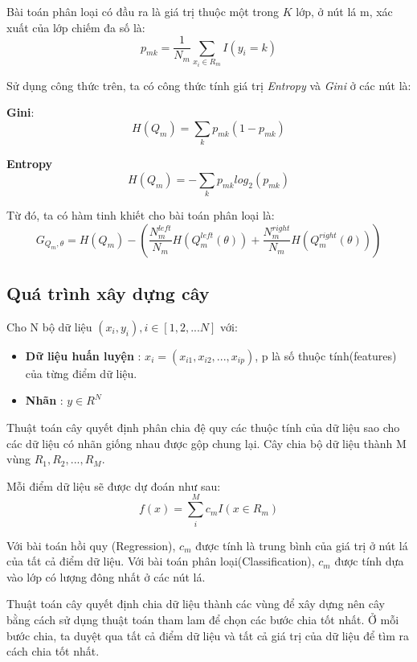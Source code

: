 \documentclass[../main-report.tex]{subfiles}
\begin{document}
\begin{enumerate}
Bài toán phân loại có đầu ra là giá trị thuộc một trong $K$ lớp, ở nút lá m, xác xuất của lớp chiếm đa số là:
\begin{equation}
    p_{mk} = \frac{1}{N_{m}} \sum_{x_{i} \in R_{m}} I(y_{i} = k)
\end{equation}

Sử dụng công thức trên, ta có công thức tính giá trị \textit{Entropy} và \textit{Gini} ở các nút là:

\textbf{Gini}:
\begin{equation}
    H(Q_{m}) = \sum_{k}p_{mk}(1 - p_{mk})
\end{equation}

\textbf{Entropy}
\begin{equation}
    H(Q_{m}) = - \sum_{k}p_{mk}log_{2}(p_{mk})
\end{equation}

Từ đó, ta có hàm tinh khiết cho bài toán phân loại là:
\begin{equation}
    G_{Q_{m}, \theta} = H(Q_{m}) - (\frac{N_{m}^{left}}{N_{m}}H(Q^{left}_{m}(\theta)) + \frac{N_{m}^{right}}{N_{m}}H(Q^{right}_{m}(\theta)))
\end{equation}
\end{enumerate}

\subsection{Quá trình xây dựng cây}
Cho N bộ dữ liệu  $(x_{i}, y_{i}), i \in [1, 2, ...N]$ với:
\begin{itemize}
\item \textbf{Dữ liệu huấn luyện} : $x_{i} = (x_{i1}, x_{i2}, ..., x_{ip})$, p là số thuộc tính(features) của từng điểm dữ liệu.
\item \textbf{Nhãn} : $y \in R^{N}$
\end{itemize}

Thuật toán cây quyết định phân chia đệ quy các thuộc tính của dữ liệu sao cho các dữ liệu có nhãn giống nhau được gộp chung lại. Cây chia bộ dữ liệu thành M vùng $R_{1}, R_{2}, ..., R_{M}$.

Mỗi điểm dữ liệu sẽ được dự đoán như sau:
$$f(x) = \sum_{i}^{M} c_{m}I(x \in R_{m})$$

Với bài toán hồi quy (Regression), $c_{m}$ được tính là trung bình của giá trị ở nút lá của tất cả điểm dữ liệu. Với bài toán phân loại(Classification), $c_{m}$ được tính dựa vào lớp có lượng đông nhất ở các nút lá.

Thuật toán cây quyết định chia dữ liệu thành các vùng để xây dựng nên cây bằng cách sử dụng thuật toán tham lam để chọn các bước chia tốt nhất.
Ở mỗi bước chia, ta duyệt qua tất cả điểm dữ liệu và tất cả giá trị của dữ liệu để tìm ra cách chia tốt nhất.
\end{document}
